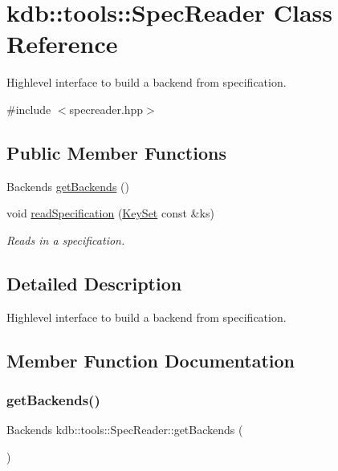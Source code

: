 \hypertarget{classkdb_1_1tools_1_1SpecReader}{}\section{kdb\+::tools\+::Spec\+Reader Class Reference}
\label{classkdb_1_1tools_1_1SpecReader}


Highlevel interface to build a backend from specification.  




{\ttfamily \#include $<$specreader.\+hpp$>$}

\subsection*{Public Member Functions}
\begin{DoxyCompactItemize}
\item 
Backends \mbox{\hyperlink{classkdb_1_1tools_1_1SpecReader_a0a1b4d2b7267d1dd4452f08fd898f0fd}{get\+Backends}} ()
\item 
void \mbox{\hyperlink{classkdb_1_1tools_1_1SpecReader_af0c638ed8094ebf3a5b4e028bbe2c38b}{read\+Specification}} (\mbox{\hyperlink{classkdb_1_1KeySet}{Key\+Set}} const \&ks)
\begin{DoxyCompactList}\small\item\em Reads in a specification. \end{DoxyCompactList}\end{DoxyCompactItemize}


\subsection{Detailed Description}
Highlevel interface to build a backend from specification. 

\subsection{Member Function Documentation}
\mbox{\label{classkdb_1_1tools_1_1SpecReader_a0a1b4d2b7267d1dd4452f08fd898f0fd}} 
\subsubsection{\texorpdfstring{getBackends()}{getBackends()}}
{\footnotesize\ttfamily Backends kdb\+::tools\+::\+Spec\+Reader\+::get\+Backends (\begin{DoxyParamCaption}{ }\end{DoxyParamCaption})\hspace{0.3cm}{\ttfamily [inline]}}

